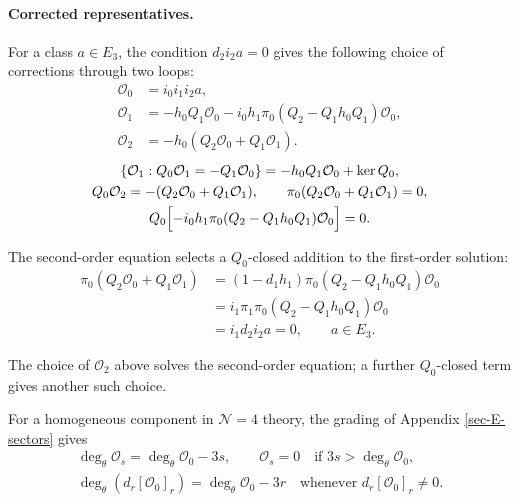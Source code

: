 \documentclass[11pt]{article}
\numberwithin{equation}{section}
\numberwithin{figure}{section}
\numberwithin{table}{section}
\begin{document}
\paragraph{Corrected representatives.}\label{corrected-representatives}

For a class $a\in E_3$, the condition $d_2i_2a=0$ gives the following choice of corrections through two loops:
\begin{equation}\label{eq-two-loop-representative-transfer}
\begin{aligned}
\mathcal O_0&=i_0i_1i_2a,\\
\mathcal O_1
&=-h_0Q_1\mathcal O_0
-i_0h_1\pi_0(Q_2-Q_1h_0Q_1)\mathcal O_0,\\
\mathcal O_2&=-h_0(Q_2\mathcal O_0+Q_1\mathcal O_1).
\end{aligned}
\end{equation}
\begin{equation}\label{b-00707}
\begin{gathered}
\{\mathcal O_1:Q_0\mathcal O_1=-Q_1\mathcal O_0\}
=-h_0Q_1\mathcal O_0+\ker Q_0,\\
Q_0\mathcal O_2=-(Q_2\mathcal O_0+Q_1\mathcal O_1),
\qquad \pi_0(Q_2\mathcal O_0+Q_1\mathcal O_1)=0,\\
Q_0\Bigl[-i_0h_1\pi_0(Q_2-Q_1h_0Q_1)\mathcal O_0\Bigr]=0.
\end{gathered}
\end{equation}

The second-order equation selects a $Q_0$-closed addition to the first-order solution:
\begin{equation}\label{eq-two-loop-representative-projection}
\begin{aligned}
\pi_0(Q_2\mathcal O_0+Q_1\mathcal O_1)
&=(1-d_1h_1)\pi_0(Q_2-Q_1h_0Q_1)\mathcal O_0\\
&=i_1\pi_1\pi_0(Q_2-Q_1h_0Q_1)\mathcal O_0\\
&=i_1d_2i_2a=0,\qquad a\in E_3.
\end{aligned}
\end{equation}

The choice of $\mathcal O_2$ above solves the second-order equation; a further $Q_0$-closed term gives another such choice.

For a homogeneous component in $\mathcal N=4$ theory, the grading of Appendix \ref{sec-E-sectors} gives
\begin{equation}\label{local-ch8-finite-correction-degree}
\begin{gathered}
\deg_\theta\mathcal O_s=\deg_\theta\mathcal O_0-3s,
\qquad \mathcal O_s=0\quad\text{if }3s>\deg_\theta\mathcal O_0,\\
\deg_\theta(d_r[\mathcal O_0]_r)=\deg_\theta\mathcal O_0-3r
\quad\text{whenever }d_r[\mathcal O_0]_r\ne0.
\end{gathered}
\end{equation}
\end{document}
